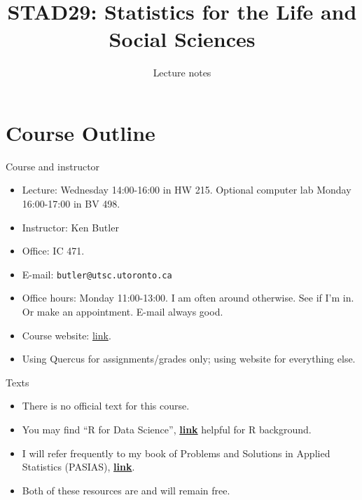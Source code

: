 \documentclass[ignorenonframetext,]{beamer}
\title{STAD29: Statistics for the Life and Social Sciences}
\author{Lecture notes}
\date{}
\begin{document}
\frame{\titlepage}

\hypertarget{course-outline}{%
\section{Course Outline}\label{course-outline}}

\begin{frame}[fragile]{Course and instructor}
\protect\hypertarget{course-and-instructor}{}

\begin{itemize}
\item
  Lecture: Wednesday 14:00-16:00 in HW 215. Optional computer lab Monday
  16:00-17:00 in BV 498.
\item
  Instructor: Ken Butler
\item
  Office: IC 471.
\item
  E-mail: \texttt{butler@utsc.utoronto.ca}
\item
  Office hours: Monday 11:00-13:00. I am often around otherwise. See if
  I'm in. Or make an appointment. E-mail always good.
\item
  Course website: \href{http://ritsokiguess.site/STAD29/}{link}.
\item
  Using Quercus for assignments/grades only; using website for
  everything else.
\end{itemize}

\end{frame}

\begin{frame}{Texts}
\protect\hypertarget{texts}{}

\begin{itemize}
\item
  There is no official text for this course.
\item
  You may find ``R for Data Science'',
  \href{http://r4ds.had.co.nz/}{\textbf{link}} helpful for R background.
\item
  I will refer frequently to my book of Problems and Solutions in
  Applied Statistics (PASIAS),
  \href{http://ritsokiguess.site/pasias/}{\textbf{link}}.
\item
  Both of these resources are and will remain free.
\end{itemize}

\end{frame}
\end{document}
